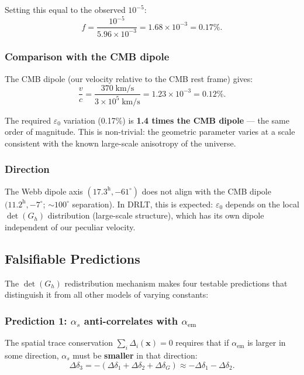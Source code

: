 Setting this equal to the observed $10^{-5}$:
\begin{equation}
\boxed{f = \frac{10^{-5}}{5.96 \times 10^{-3}} = 1.68 \times 10^{-3} = 0.17\%.}
\end{equation}

\subsubsection{Comparison with the CMB dipole}

The CMB dipole (our velocity relative to the CMB rest frame) gives:
\begin{equation}
\frac{v}{c} = \frac{370\;\text{km/s}}{3 \times 10^5\;\text{km/s}} = 1.23 \times 10^{-3} = 0.12\%.
\end{equation}

The required $\varepsilon_0$ variation (0.17\%) is \textbf{1.4 times the CMB dipole} --- the same order of magnitude. This is non-trivial: the geometric parameter varies at a scale consistent with the known large-scale anisotropy of the universe.

\subsubsection{Direction}

The Webb dipole axis $(17.3^\text{h}, -61^\circ)$ does not align with the CMB dipole $(11.2^\text{h}, -7^\circ$; $\sim 100^\circ$ separation). In DRLT, this is expected: $\varepsilon_0$ depends on the local $\det(G_h)$ distribution (large-scale structure), which has its own dipole independent of our peculiar velocity.

\subsection{Falsifiable Predictions}

The $\det(G_h)$ redistribution mechanism makes four testable predictions that distinguish it from all other models of varying constants:

\subsubsection{Prediction 1: $\alpha_s$ anti-correlates with $\alpha_\text{em}$}

The spatial trace conservation $\sum_i \Delta_i(\mathbf{x}) = 0$ requires that if $\alpha_\text{em}$ is larger in some direction, $\alpha_s$ must be \textbf{smaller} in that direction:
\begin{equation}
\Delta\delta_3 = -(\Delta\delta_1 + \Delta\delta_2 + \Delta\delta_G) \approx -\Delta\delta_1 - \Delta\delta_2.
\end{equation}

